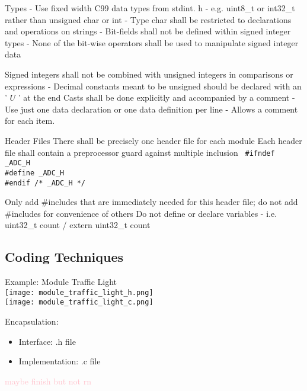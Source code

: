 \begin{definition}{Types}
    - Use fixed width C99 data types from stdint. h
    - e.g. uint8\_t or int32\_t rather than unsigned char or int
    - Type char shall be restricted to declarations and operations on strings
    - Bit-fields shall not be defined within signed integer types
    - None of the bit-wise operators shall be used to manipulate signed integer data

    Signed integers shall not be combined with unsigned integers in comparisons or expressions
- Decimal constants meant to be unsigned should be declared with an ' $U$ ' at the end
Casts shall be done explicitly and accompanied by a comment
- Use just one data declaration or one data definition per line
- Allows a comment for each item.
\end{definition}

\begin{definition}{Header Files}
    There shall be precisely one header file for each module
Each header file shall contain a preprocessor guard against multiple inclusion
\texttt{
\#ifndef \_ADC\_H \\
\#define \_ADC\_H \\
\#endif /* \_ADC\_H */
}

Only add \#includes that are immediately needed for this header file; do not add \#includes for convenience of others
Do not define or declare variables
- i.e. uint32\_t count / extern uint32\_t count

\end{definition}

\multend

\subsection{Coding Techniques}

\begin{example2}{Example: Module Traffic Light}
    \\
    \texttt{[image: module\_traffic\_light\_h.png]}
    \\
    \texttt{[image: module\_traffic\_light\_c.png]}
\end{example2}


\begin{remark}
    Encapsulation:
    \begin{itemize}
        \item Interface: .h file
        \item Implementation: .c file
    \end{itemize}
\end{remark}

\begin{remark}
    \textcolor{pink}{maybe finish but not rn}
\end{remark}

\multend

